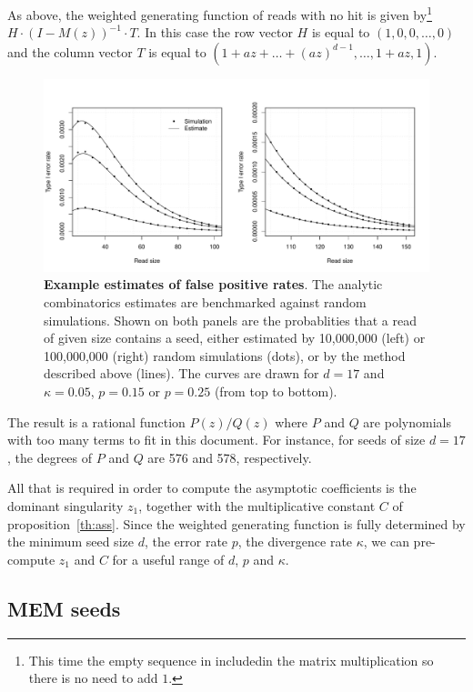 \documentclass{article}
\begin{document}
As above, the weighted generating function of reads with no hit is given
by\footnote{This time the empty sequence in includedin the matrix
multiplication so there is no need to add $1$.} $H \cdot (I-M(z))^{-1}
\cdot T$. In this case the row vector $H$ is equal to
$(1,0,0,\ldots,0)$ and the column vector $T$ is equal to
$(1+az+\ldots+(az)^{d-1}, \ldots, 1+az, 1)$.


\begin{figure}[h]
\centering
\includegraphics[scale=0.445]{simulp_false_positives.pdf}
\caption{\textbf{Example estimates of false positive rates}. The analytic
combinatorics estimates are benchmarked against random simulations. Shown
on both panels are the probablities that a read of given size contains a
seed, either estimated by 10,000,000 (left) or 100,000,000 (right) random
simulations (dots), or by the method described above (lines). The curves
are drawn for $d=17$ and $\kappa=0.05$, $p=0.15$ or $p=0.25$ (from top to
bottom).}
\label{fig:simulp_fp}
\end{figure}


The result is a rational function
$P(z)/Q(z)$ where $P$ and $Q$ are polynomials with too many terms to fit
in this document. For instance, for seeds of size $d=17$, the degrees of
$P$ and $Q$ are 576 and 578, respectively.

All that is required in order to compute the asymptotic coefficients is
the dominant singularity $z_1$, together with the multiplicative constant
$C$ of proposition~\ref{th:ass}. Since the weighted generating function is
fully determined by the minimum seed size $d$, the error rate $p$, the
divergence rate  $\kappa$, we can pre-compute $z_1$ and $C$ for a useful
range of $d$, $p$ and $\kappa$.



\subsection{MEM seeds}
\end{document}
